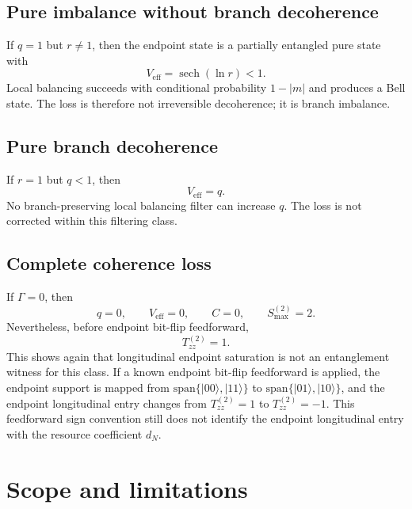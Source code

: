 \documentclass[reprint,aps,pra,superscriptaddress,nofootinbib,longbibliography]{revtex4-2}
\newcommand{\ket}[1]{|#1\rangle}
\newcommand{\sech}{\operatorname{sech}}
\newcommand{\Veff}{V_{\mathrm{eff}}}
\begin{document}
\subsection{Pure imbalance without branch decoherence}

If \(q=1\) but \(r\ne1\), then the endpoint state is a partially entangled pure state with
\begin{equation}
\Veff=\sech(\ln r)<1.
\end{equation}
Local balancing succeeds with conditional probability \(1-|m|\) and produces a Bell state.  The loss is therefore not irreversible decoherence; it is branch imbalance.

\subsection{Pure branch decoherence}

If \(r=1\) but \(q<1\), then
\begin{equation}
\Veff=q.
\end{equation}
No branch-preserving local balancing filter can increase \(q\).  The loss is not corrected within this filtering class.

\subsection{Complete coherence loss}

If \(\Gamma=0\), then
\begin{equation}
q=0,
\qquad
\Veff=0,
\qquad
C=0,
\qquad
S_{\max}^{(2)}=2.
\end{equation}
Nevertheless, before endpoint bit-flip feedforward,
\begin{equation}
T^{(2)}_{zz}=1.
\end{equation}
This shows again that longitudinal endpoint saturation is not an entanglement witness for this class.  If a known endpoint bit-flip feedforward is applied, the endpoint support is mapped from \(\mathrm{span}\{\ket{00},\ket{11}\}\) to \(\mathrm{span}\{\ket{01},\ket{10}\}\), and the endpoint longitudinal entry changes from \(T^{(2)}_{zz}=1\) to \(T^{(2)}_{zz}=-1\).  This feedforward sign convention still does not identify the endpoint longitudinal entry with the resource coefficient \(d_N\).

\section{Scope and limitations}
\end{document}
